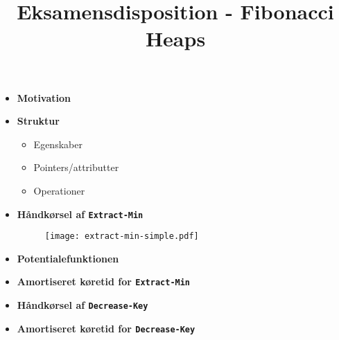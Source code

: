 
\title{Eksamensdisposition - Fibonacci Heaps}


\maketitle



\begin{itemize}
\item \textbf{Motivation}


\item \textbf{Struktur}
\begin{itemize}
	\item Egenskaber
	\item Pointers/attributter
	\item Operationer
\end{itemize}


\item \textbf{Håndkørsel af \texttt{Extract-Min}}
\begin{figure}[H]
	\begin{center}
		\texttt{[image: extract-min-simple.pdf]}
	\end{center}
\end{figure}

\item \textbf{Potentialefunktionen}

\item \textbf{Amortiseret køretid for \texttt{Extract-Min}}

\item \textbf{Håndkørsel af \texttt{Decrease-Key}}
\item \textbf{Amortiseret køretid for \texttt{Decrease-Key}}

\end{itemize}

